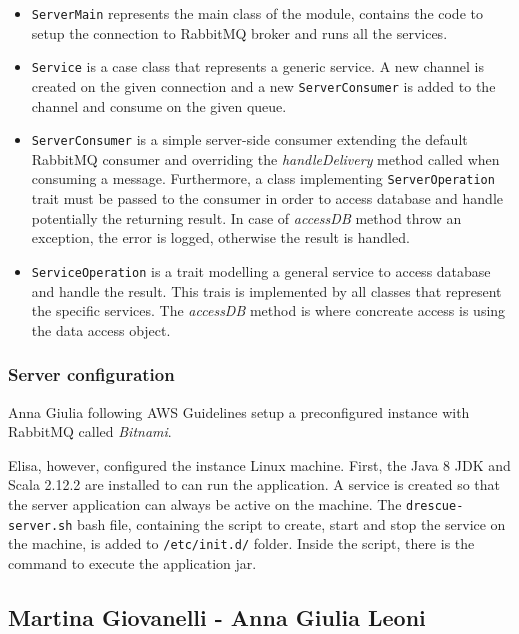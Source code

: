 \documentclass[a4paper,12pt]{report}
\begin{document}
\begin{itemize}
\item \texttt{ServerMain} represents the main class of the module, contains the code to setup the connection to RabbitMQ broker and runs all the services.
\item \texttt{Service} is a case class that represents a generic service. A new channel is created on the given connection and a new \texttt{ServerConsumer} is added to the channel and consume on the given queue.
\item \texttt{ServerConsumer} is a simple server-side consumer extending the default RabbitMQ consumer and overriding the \emph{handleDelivery} method called when consuming a message. Furthermore, a class implementing \texttt{ServerOperation} trait must be passed to the consumer in order to access database and handle potentially the returning result. In case of \emph{accessDB} method throw an exception, the error is logged, otherwise the result is handled. 
\item \texttt{ServiceOperation} is a trait modelling a general service to access database and handle the result. This trais is implemented by all classes that represent the specific services. The \emph{accessDB} method is where concreate access is using the data access object.
\end{itemize}

\subsubsection{Server configuration}
Anna Giulia following AWS Guidelines setup a preconfigured instance with RabbitMQ called \emph{Bitnami}.

Elisa, however, configured the instance Linux machine. First, the Java 8 JDK and Scala 2.12.2 are installed to can run the application. A service is created so that the server application can always be active on the machine. The \texttt{drescue-server.sh} bash file, containing the script to create, start and stop the service on the machine, is added to \texttt{/etc/init.d/} folder. Inside the script, there is the command to execute the application jar.

\subsection{Martina Giovanelli - Anna Giulia Leoni}
\end{document}
